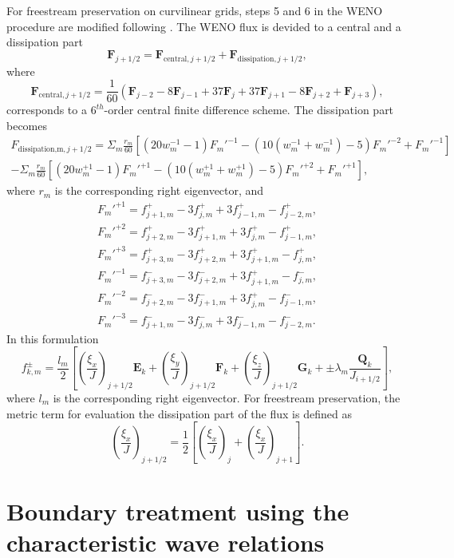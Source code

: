 For freestream preservation on curvilinear grids, steps 5 and 6 in the W\+E\+NO procedure are modified following \cite{nonomura2015new}. The W\+E\+NO flux is devided to a central and a dissipation part \cite{jiang1999high} \[ \begin{equation*} \mathbf{F}_{j+1/2}=\mathbf{F}_{\textrm{central},j+1/2}+\mathbf{F}_{\textrm{dissipation},j+1/2}, \end{equation*} \] where \[ \begin{equation*} \mathbf{F}_{\textrm{central},j+1/2}=\frac{1}{60}\left(\mathbf{F}_{j-2}-8\mathbf{F}_{j-1}+37\mathbf{F}_j+37\mathbf{F}_{j+1}-8\mathbf{F}_{j+2}+\mathbf{F}_{j+3}\right), \end{equation*} \] corresponds to a $6^{th}$-\/order central finite difference scheme. The dissipation part becomes \[ \begin{align*} F_{\textrm{dissipation,m},j+1/2}=\Sigma_m \frac{r_m}{60}\left[(20 w_m^{-1} -1) F_m'^{-1} -(10(w_m^{-1}+w_m^{-1})-5) F_m'^{-2}+F_m'^{-1}\right]\\ -\Sigma_m \frac{r_m}{60}\left[(20 w_m^{+1} -1) F_m'^{+1} -(10(w_m^{+1}+w_m^{+1})-5) F_m'^{+2}+F_m'^{+1}\right], \end{align*} \] where $r_m$ is the corresponding right eigenvector, and \[ \begin{align*} F_m'^{+1}= f_{j+1,m}^{+}-3 f_{j,m}^{+}+3 f_{j-1,m}^{+}-f_{j-2,m}^{+},\\ F_m'^{+2}= f_{j+2,m}^{+}-3 f_{j+1,m}^{+}+3 f_{j,m}^{+}-f_{j-1,m}^{+},\\ F_m'^{+3}= f_{j+3,m}^{+}-3 f_{j+2,m}^{+}+3 f_{j+1,m}^{+}-f_{j,m}^{+},\\ F_m'^{-1}= f_{j+3,m}^{-}-3 f_{j+2,m}^{-}+3 f_{j+1,m}^{+}-f_{j,m}^{-},\\ F_m'^{-2}= f_{j+2,m}^{-}-3 f_{j+1,m}^{-}+3 f_{j,m}^{+}-f_{j-1,m}^{-},\\ F_m'^{-3}= f_{j+1,m}^{-}-3 f_{j,m}^{-}+3 f_{j-1,m}^{-}-f_{j-2,m}^{-}. \end{align*} \] In this formulation \[ \begin{equation*} f^{\pm}_{k,m}=\frac{l_m}{2}\left[\left(\frac{\xi_x}{J}\right)_{j+1/2} \mathbf{E}_k +\left(\frac{\xi_y}{J}\right)_{j+1/2} \mathbf{F}_k +\left(\frac{\xi_z}{J}\right)_{j+1/2} \mathbf{G}_k +\pm \lambda_m \frac{\mathbf{Q}_k}{J_{i+1/2}} \right], \end{equation*} \] where $l_m$ is the corresponding right eigenvector. For freestream preservation, the metric term for evaluation the dissipation part of the flux is defined as \cite{jiang1999high} \[ \begin{equation*} \left(\frac{\xi_x}{J}\right)_{j+1/2}=\frac{1}{2}\left[\left(\frac{\xi_x}{J}\right)_j+\left(\frac{\xi_x}{J}\right)_{j+1}\right]. \end{equation*} \]\hypertarget{weno_nscbc}{}\section{Boundary treatment using the characteristic wave relations}\label{weno_nscbc}
